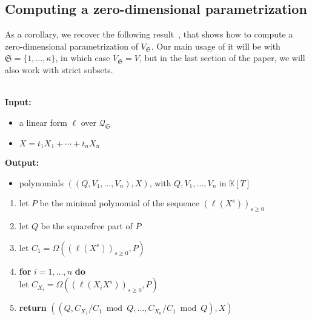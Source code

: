 \documentclass[final,1p,times,authoryear]{elsarticle}
\newcommand{\minpoly}{P}
\newcommand{\lf}{X}
\newcommand{\residueI}{\mathscr{Q}}
\newcommand{\sqfree}{Q}
\def\dg{\kappa}
\def\K{\mathbb{K}}
\def\K {\ensuremath{\mathbb{K}}}
\begin{document}

\subsection{Computing a zero-dimensional parametrization}  \label{ssec:abstractlago}

As a corollary, we recover the following
result~\cite[Proposition~3]{BoSaSc03}, that shows how to compute a
zero-dimensional parametrization of $V_{\mathfrak{S}}$. Our main usage
of it will be with $\mathfrak{S}=\{1,\dots,\dg\}$, in which case
$V_{\mathfrak{S}}=V$, but in the last section of the paper, we will
also work with strict subsets. 

\begin{algorithm}[H]
  \caption{$\mathsf{Parametrization}(\ell,\lf)$}  ~\\
  {\bf Input:} \vspace{-0.5em}
  \begin{itemize}\setlength\itemsep{0em}
    \item  a linear form $\ell$ over $\residueI_\mathfrak{S}$
    \item $\lf=t_1 X_1 + \cdots + t_n X_n$
  \end{itemize}
  {\bf Output:}  \vspace{-0.5em}
  \begin{itemize}
    \item              polynomials $((\sqfree,V_1,\dots,V_n),\lf)$, with $\sqfree,V_1,\dots,V_n$ in $\K[T]$
  \end{itemize}
  \begin{enumerate}\setlength\itemsep{0em}
    \item let $\minpoly$ be the minimal polynomial of the sequence $(\ell(\lf^s))_{s \ge 0}$
    \item let $\sqfree$ be the squarefree part of $\minpoly$
    \item let $C_1 = \Omega((\ell(\lf^s))_{s\ge0} ,\minpoly)$
    \item \textbf{for} $i=1,\dots,n$ \textbf{do} \\
      \phantom{for} let $C_{X_i} = \Omega((\ell(X_i \lf^s))_{s\ge0}, \minpoly)$ 
    \item \textbf{return} $((\sqfree, C_{X_1}/ C_1 \bmod \sqfree, \dots, C_{X_n}/ C_{1} \bmod \sqfree),\lf)$
  \end{enumerate}
  \label{algo:para2}
\end{algorithm}
\end{document}
